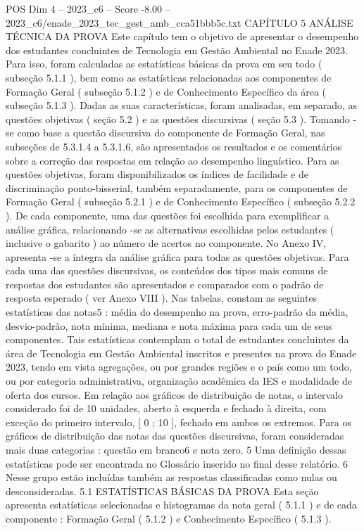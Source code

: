 \begin{textsample}{POS Dim 4 – 2023\_c6 – Score -8.00 – 2023\_c6/enade\_2023\_tec\_gest\_amb\_cca51bbb5c.txt}  \label{ex:f4_pos_342}
CAPÍTULO 5 ANÁLISE TÉCNICA DA PROVA Este capítulo tem o objetivo de apresentar o desempenho dos estudantes concluintes de Tecnologia em Gestão Ambiental no Enade 2023.
Para isso, foram calculadas as estatísticas básicas da prova em seu todo ( subseção 5.1.1 ), bem como as estatísticas relacionadas aos componentes de Formação Geral ( subseção 5.1.2 ) e de Conhecimento Específico da área ( subseção 5.1.3 ).
Dadas as suas características, foram analisadas, em separado, as questões objetivas ( seção 5.2 ) e as questões discursivas ( seção 5.3 ).
Tomando -se como base a questão discursiva do componente de Formação Geral, nas subseções de 5.3.1.4 a 5.3.1.6, são apresentados os resultados e os comentários sobre a correção das respostas em relação ao desempenho linguístico.
Para as questões objetivas, foram disponibilizados os índices de facilidade e de discriminação ponto-bisserial, também separadamente, para os componentes de Formação Geral ( subseção 5.2.1 ) e de Conhecimento Específico ( subseção 5.2.2 ).
De cada componente, uma das questões foi escolhida para exemplificar a análise gráfica, relacionando -se as alternativas escolhidas pelos estudantes ( inclusive o gabarito ) ao número de acertos no componente.
No Anexo IV, apresenta -se a íntegra da análise gráfica para todas as questões objetivas.
Para cada uma das questões discursivas, os conteúdos dos tipos mais comuns de respostas dos estudantes são apresentados e comparados com o padrão de resposta esperado ( ver Anexo VIII ).
Nas tabelas, constam as seguintes estatísticas das notas5 : média do desempenho na prova, erro-padrão da média, desvio-padrão, nota mínima, mediana e nota máxima para cada um de seus componentes.
Tais estatísticas contemplam o total de estudantes concluintes da área de Tecnologia em Gestão Ambiental inscritos e presentes na prova do Enade 2023, tendo em vista agregações, ou por grandes regiões e o país como um todo, ou por categoria administrativa, organização acadêmica da IES e modalidade de oferta dos cursos.
Em relação aos gráficos de distribuição de notas, o intervalo considerado foi de 10 unidades, aberto à esquerda e fechado à direita, com exceção do primeiro intervalo, [ 0 ; 10 ], fechado em ambos os extremos.
Para os gráficos de distribuição das notas das questões discursivas, foram consideradas mais duas categorias : questão em branco6 e nota zero. 5 Uma definição dessas estatísticas pode ser encontrada no Glossário inserido no final desse relatório. 6 Nesse grupo estão incluídas também as respostas classificadas como nulas ou desconsideradas. 5.1 ESTATÍSTICAS BÁSICAS DA PROVA Esta seção apresenta estatísticas selecionadas e histogramas da nota geral ( 5.1.1 ) e de cada componente : Formação Geral ( 5.1.2 ) e Conhecimento Específico ( 5.1.3 ).

\end{textsample}
